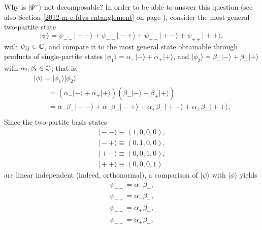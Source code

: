 {Why is $\vert \Psi^-\rangle$ not decomposable?
In order to be able to answer this question
(see also Section \ref{2012-m-c-fdvs-entanglement} on page \pageref{2012-m-c-fdvs-entanglement}), consider
the most general two-partite state
\begin{equation}
\vert \psi \rangle
=
\psi_{--}\vert -- \rangle
+
\psi_{-+}\vert -+ \rangle
+
\psi_{+-}\vert +- \rangle
+
\psi_{++}\vert ++ \rangle
,
\end{equation}
with $\psi_{ij}\in {\Bbb C}$,
and compare it to the most general state obtainable through products of single-partite states
$\vert \phi_1\rangle  = \alpha_-  \vert - \rangle    + \alpha_+  \vert + \rangle$,
and
$\vert \phi_2\rangle  = \beta_-  \vert - \rangle    + \beta_+  \vert + \rangle$
with $\alpha_{i}, \beta_i \in {\Bbb C}$;
that is,
\begin{equation}
\begin{split}
\vert \phi \rangle  =\vert \phi_1\rangle    \vert \phi_2\rangle   \\
\qquad =
(\alpha_-  \vert - \rangle    + \alpha_+  \vert + \rangle )
(\beta_-  \vert - \rangle    + \beta_+  \vert + \rangle )   \\
\qquad  =\alpha_- \beta_- \vert -- \rangle    + \alpha_-\beta_+  \vert -+ \rangle +
\alpha_+ \beta_- \vert +- \rangle    + \alpha_+\beta_+  \vert ++ \rangle. \\
\end{split}
\end{equation}
Since the two-partite basis states
\begin{equation}
\begin{split}
\vert -- \rangle  \equiv (1,0,0,0)
,\\
\vert -+ \rangle    \equiv (0,1,0,0)
,\\
\vert +- \rangle     \equiv (0,0,1,0)
,\\
\vert ++ \rangle      \equiv (0,0,0,1)
\end{split}
\end{equation}
are linear independent (indeed, orthonormal),
a comparison of $\vert \psi \rangle  $ with  $\vert \phi \rangle$ yields
\begin{equation}
\begin{split}
\psi_{--}=  \alpha_- \beta_-
,\\
\psi_{-+}=   \alpha_-\beta_+
,\\
\psi_{+-}=  \alpha_+ \beta_-
,\\
\psi_{++}= \alpha_+\beta_+
.
\end{split}
\end{equation}
}
